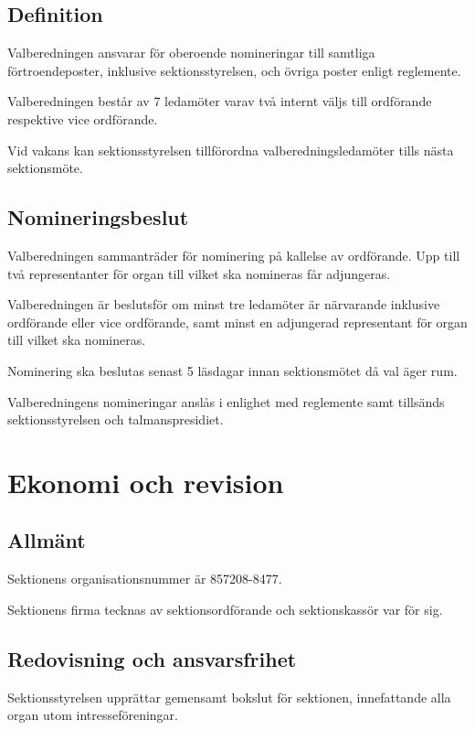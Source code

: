 \documentclass{styrdokument}
\begin{document}
\subsection{Definition}

\? Valberedningen ansvarar för oberoende nomineringar till samtliga förtroendeposter, inklusive sektionsstyrelsen, och övriga poster enligt reglemente.
  
\? Valberedningen består av 7 ledamöter varav två internt väljs till ordförande respektive vice ordförande.

\? Vid vakans kan sektionsstyrelsen tillförordna valberedningsledamöter tills nästa sektionsmöte.

\subsection{Nomineringsbeslut}

\? Valberedningen sammanträder för nominering på kallelse av ordförande.
Upp till två representanter för organ till vilket ska nomineras får adjungeras.

\? Valberedningen är beslutsför om minst tre ledamöter är närvarande inklusive ordförande eller vice ordförande, samt minst en adjungerad representant för organ till vilket ska nomineras.

\? Nominering ska beslutas senast 5 läsdagar innan sektionsmötet då val äger rum.

\? Valberedningens nomineringar anslås i enlighet med reglemente samt tillsänds sektionsstyrelsen och talmanspresidiet.

\section{Ekonomi och revision}
\subsection{Allmänt}

\? Sektionens organisationsnummer är 857208-8477.

\? Sektionens firma tecknas av sektionsordförande och sektionskassör var för
sig.

\subsection{Redovisning och ansvarsfrihet} \label{arsredovisning}

\? Sektionsstyrelsen upprättar gemensamt bokslut för sektionen, innefattande alla organ utom intresseföreningar.
\end{document}
